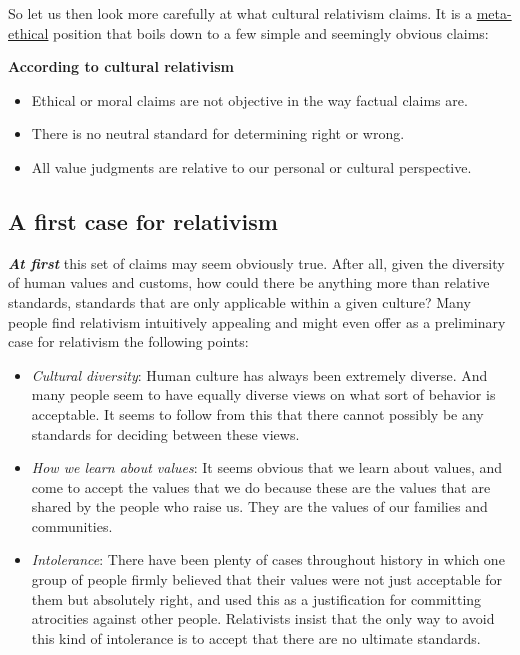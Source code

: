 \documentclass[
  12pt, openany]{book}
\makeatletter
\providecommand{\tightlist}{%
  \setlength{\itemsep}{0pt}\setlength{\parskip}{0pt}}
\newenvironment{kframe}{%
\medskip{}
\setlength{\fboxsep}{.8em}
 \def\at@end@of@kframe{}%
 \ifinner\ifhmode%
  \def\at@end@of@kframe{\end{minipage}}%
  \begin{minipage}{\columnwidth}%
 \fi\fi%
 \def\FrameCommand##1{\hskip\@totalleftmargin \hskip-\fboxsep
 \colorbox{shadecolor}{##1}\hskip-\fboxsep
     \hskip-\linewidth \hskip-\@totalleftmargin \hskip\columnwidth}%
 \MakeFramed {\advance\hsize-\width
   \@totalleftmargin\z@ \linewidth\hsize
   \@setminipage}}%
 {\par\unskip\endMakeFramed%
 \at@end@of@kframe}
\newenvironment{rmdblock}[1]
  {
  \begin{itemize}
  \renewcommand{\labelitemi}{
    \raisebox{-.7\height}[0pt][0pt]{
      {\setkeys{Gin}{width=3em,keepaspectratio}\texttt{[image: img/\#1]}}
    }
  }
  \setlength{\fboxsep}{1em}
  \begin{kframe}
  \item
  }
  {
  \end{kframe}
  \end{itemize}
  }
\newenvironment{note}
  {\begin{rmdblock}{note}}
  {\end{rmdblock}}
\theoremstyle{definition}
\theoremstyle{definition}
\theoremstyle{definition}
\theoremstyle{definition}
\theoremstyle{remark}
\makeatother
\begin{document}
So let us then look more carefully at what cultural relativism claims. It is a \protect\hyperlink{meta-ethics}{meta-ethical} position that boils down to a few simple and seemingly obvious claims:

\begin{note}

\textbf{According to cultural relativism}

\begin{itemize}
\tightlist
\item
  Ethical or moral claims are not objective in the way factual claims are.
\item
  There is no neutral standard for determining right or wrong.
\item
  All value judgments are relative to our personal or cultural perspective.
\end{itemize}


\end{note}

\hypertarget{a-first-case-for-relativism}{%
\subsection*{A first case for relativism}\label{a-first-case-for-relativism}}


\textbf{\emph{At first}} this set of claims may seem obviously true. After all, given the diversity of human values and customs, how could there be anything more than relative standards, standards that are only applicable within a given culture? Many people find relativism intuitively appealing and might even offer as a preliminary case for relativism the following points:

\begin{itemize}
\tightlist
\item
  \emph{Cultural diversity}: Human culture has always been extremely diverse. And many people seem to have equally diverse views on what sort of behavior is acceptable. It seems to follow from this that there cannot possibly be any standards for deciding between these views.
\item
  \emph{How we learn about values}: It seems obvious that we learn about values, and come to accept the values that we do because these are the values that are shared by the people who raise us. They are the values of our families and communities.
\item
  \emph{Intolerance}: There have been plenty of cases throughout history in which one group of people firmly believed that their values were not just acceptable for them but absolutely right, and used this as a justification for committing atrocities against other people. Relativists insist that the only way to avoid this kind of intolerance is to accept that there are no ultimate standards.
\end{itemize}
\end{document}
